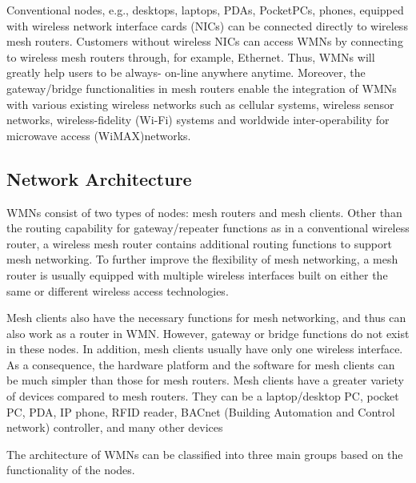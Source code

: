 \documentclass[12pt,a4paper]{report}
\begin{document}
Conventional nodes, e.g., desktops, laptops, PDAs, PocketPCs, phones, equipped with
wireless network interface cards (NICs) can be connected directly to wireless mesh routers.
Customers without wireless NICs can access WMNs by connecting to wireless mesh
routers through, for example, Ethernet. Thus, WMNs will greatly help users to be always-
on-line anywhere anytime. Moreover, the gateway/bridge functionalities in mesh routers
enable the integration of WMNs with various existing wireless networks such as cellular
systems, wireless sensor networks, wireless-fidelity (Wi-Fi) systems and worldwide
inter-operability for microwave access (WiMAX)networks.


\subsection{Network Architecture}
WMNs consist of two types of nodes: mesh routers and mesh clients. Other than the routing
capability for gateway/repeater functions as in a conventional wireless router, a wireless mesh
router contains additional routing functions to support mesh networking. To further improve
the flexibility of mesh networking, a mesh router is usually equipped with multiple wireless
interfaces built on either the same or different wireless access technologies.

Mesh clients also have the necessary functions for mesh networking, and thus can also
work as a router in WMN. However, gateway or bridge functions do not exist in these nodes.
In addition, mesh clients usually have only one wireless interface. As a consequence, the
hardware platform and the software for mesh clients can be much simpler than those for mesh
routers. Mesh clients have a greater variety of devices compared to mesh routers. They can be
a laptop/desktop PC, pocket PC, PDA, IP phone, RFID reader, BACnet (Building Automation
and Control network) controller, and many other devices

The architecture of WMNs can be classified into three main groups based on the
functionality of the nodes.
\end{document}
